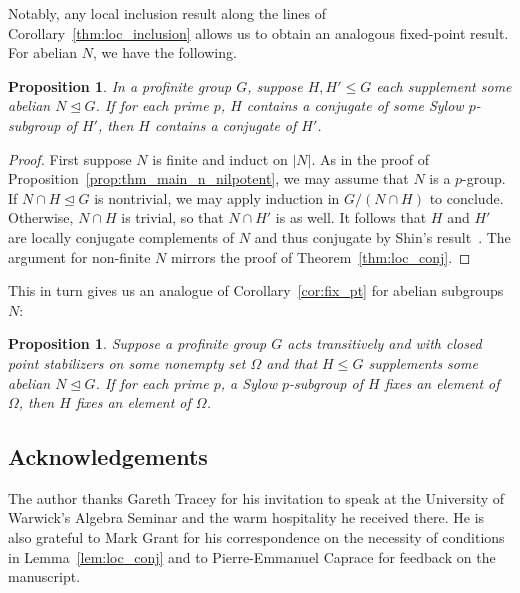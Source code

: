 \documentclass{amsart}
\newtheorem{proposition}[theorem]{Proposition}
\theoremstyle{definition}
\theoremstyle{remark}
\numberwithin{equation}{section}
\newcommand{\normal}{\trianglelefteq}
\providecommand{\abs}[1]{\ensuremath{\lvert#1\rvert}}
\begin{document}
Notably, any local inclusion result along the lines of Corollary~\ref{thm:loc_inclusion} allows us to obtain an analogous fixed-point result. For abelian $N$, we have the following.

\begin{proposition}
	\label{thm:loc_inclusion_ab}
	In a profinite group $G$, suppose $H, H' \leq G$ each supplement some abelian $N \normal G$. If for each prime $p$, $H$ contains a conjugate of some Sylow $p$-subgroup of $H'$, then $H$ contains a conjugate of $H'$.
\end{proposition}

\begin{proof}
	First suppose $N$ is finite and induct on $\abs{N}$. As in the proof of Proposition~\ref{prop:thm_main_n_nilpotent}, we may assume that $N$ is a $p$-group. If $N\cap H \normal G$ is nontrivial, we may apply induction in $G/(N\cap H)$ to conclude. Otherwise, $N \cap H$ is trivial, so that $N \cap H'$ is as well. It follows that $H$ and $H'$ are locally conjugate complements of $N$ and thus conjugate by Shin's result~\cite{Shi95}. The argument for non-finite $N$ mirrors the proof of Theorem~\ref{thm:loc_conj}.
\end{proof}

This in turn gives us an analogue of Corollary~\ref{cor:fix_pt} for abelian subgroups $N$:
\begin{proposition}
	\label{thm:fix_pt_ab}
	Suppose a profinite group $G$ acts transitively and with closed point stabilizers on some nonempty set $\Omega$ and that $H\leq G$ supplements some abelian $N\normal G$. If for each prime $p$, a Sylow $p$-subgroup of $H$ fixes an element of $\Omega$, then $H$ fixes an element of $\Omega$.
\end{proposition}

\subsection*{Acknowledgements}
The author thanks Gareth Tracey for his invitation to speak at the University of Warwick's Algebra Seminar and the warm hospitality he received there. He is also grateful to Mark Grant for his correspondence on the necessity of conditions in Lemma~\ref{lem:loc_conj} and to Pierre-Emmanuel Caprace for feedback on the manuscript.

%
%
\end{document}
